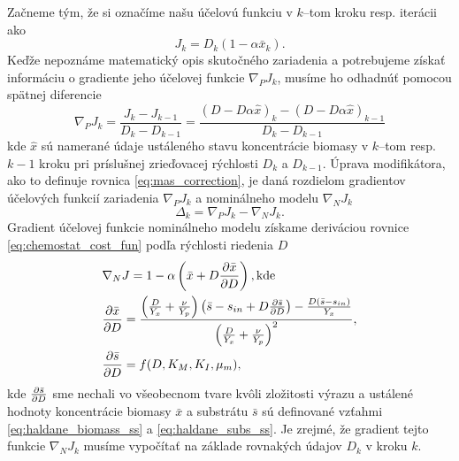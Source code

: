 Začneme tým, že si označíme našu účelovú funkciu v $ k $--tom kroku resp. iterácii ako
\begin{equation}
\label{eq:chemostat_cost_fun}
	J_{k} = D_{k}\left(1-\alpha\bar{x}_{k}\right).
\end{equation}
Keďže nepoznáme matematický opis skutočného zariadenia a potrebujeme získať informáciu o gradiente jeho účelovej funkcie $ \nabla_{P}J_{k} $, musíme ho odhadnúť pomocou spätnej diferencie
\begin{equation}
	\nabla_{P}J_{k} = \frac{J_{k} - J_{k-1}}{D_{k} - D_{k-1}} = \frac{\left(D-D\alpha\hat{x}\right)_{k} - \left(D-D\alpha\hat{x}\right)_{k-1}}{D_{k} - D_{k-1}}
\end{equation}
kde $ \hat{x} $ sú namerané údaje ustáleného stavu koncentrácie biomasy v $ k $--tom resp. $ k-1 $ kroku pri príslušnej zrieďovacej rýchlosti $ D_{k} $ a $ D_{k-1} $. Úprava modifikátora, ako to definuje rovnica \eqref{eq:mas_correction}, je daná rozdielom gradientov účelových funkcií zariadenia $ \nabla_{P}J_{k} $ a nominálneho modelu $ \nabla_{N}J_{k} $ 
\begin{equation}
\label{eq:mas_chemostat_modifierValue}
	\Delta_k = \nabla_{P}J_{k} - \nabla_{N}J_{k}.
\end{equation}
Gradient účelovej funkcie nominálneho modelu získame deriváciou rovnice \eqref{eq:chemostat_cost_fun} podľa rýchlosti riedenia $ D $
\begin{align}
	&\nabla_{N}J = 1 - \alpha\left(\bar{x}+D\frac{\partial \bar{x}}{\partial D}\right), \text{kde}\\
	&\frac{\partial \bar{x}}{\partial D} = \frac{\left(\frac{D}{Y_{x}} + \frac{\nu}{Y_{p}}\right)\left(\bar{s}-s_{in}+D\frac{\partial \bar{s}}{\partial D}\right) - \frac{D\left(\bar{s}-s_{in}\right)}{Y_{x}}}{\left(\frac{D}{Y_{x}} + \frac{\nu}{Y_{p}}\right)^2},	\\
	&\frac{\partial \bar{s}}{\partial D} = f(D,K_{M},K_{I},\mu_{m}),
\end{align}
kde $ \frac{\partial \bar{s}}{\partial D} $ sme nechali vo všeobecnom tvare kvôli zložitosti výrazu a ustálené hodnoty koncentrácie biomasy $ \bar{x} $ a substrátu $ \bar{s} $ sú definované vzťahmi \eqref{eq:haldane_biomass_ss} a \eqref{eq:haldane_subs_ss}. Je zrejmé, že gradient tejto funkcie $ \nabla_{N}J_{k} $ musíme vypočítať na základe rovnakých údajov $ D_k $ v kroku $ k $. 

